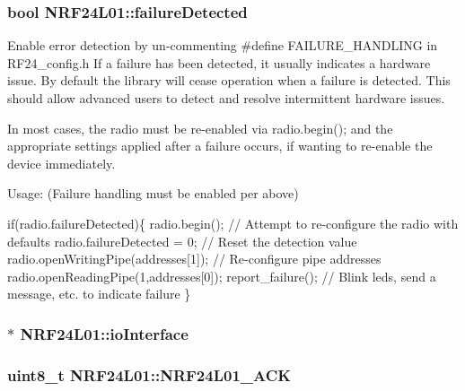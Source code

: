 \subsubsection[{\texorpdfstring{failure\+Detected}{failureDetected}}]{\setlength{\rightskip}{0pt plus 5cm}bool N\+R\+F24\+L01\+::failure\+Detected}\hypertarget{classNRF24L01_a749f38c45c00905b3d8e8c180626bff6}{}\label{classNRF24L01_a749f38c45c00905b3d8e8c180626bff6}
Enable error detection by un-\/commenting \#define F\+A\+I\+L\+U\+R\+E\+\_\+\+H\+A\+N\+D\+L\+I\+NG in R\+F24\+\_\+config.\+h If a failure has been detected, it usually indicates a hardware issue. By default the library will cease operation when a failure is detected. This should allow advanced users to detect and resolve intermittent hardware issues.

In most cases, the radio must be re-\/enabled via radio.\+begin(); and the appropriate settings applied after a failure occurs, if wanting to re-\/enable the device immediately.

Usage\+: (Failure handling must be enabled per above) 
\begin{DoxyCode}
\textcolor{keywordflow}{if}(radio.failureDetected)\{
  radio.begin();                       \textcolor{comment}{// Attempt to re-configure the radio with defaults}
  radio.failureDetected = 0;           \textcolor{comment}{// Reset the detection value}
 radio.openWritingPipe(addresses[1]); \textcolor{comment}{// Re-configure pipe addresses}
  radio.openReadingPipe(1,addresses[0]);
  report\_failure();                    \textcolor{comment}{// Blink leds, send a message, etc. to indicate failure}
\}
\end{DoxyCode}
\subsubsection[{\texorpdfstring{io\+Interface}{ioInterface}}]{$\ast$ N\+R\+F24\+L01\+::io\+Interface\hspace{0.3cm}{\ttfamily [private]}}\hypertarget{classNRF24L01_ae1eea9f32346ecf60ffbf5224d338359}{}\label{classNRF24L01_ae1eea9f32346ecf60ffbf5224d338359}
\subsubsection[{\texorpdfstring{N\+R\+F24\+L01\+\_\+\+A\+CK}{NRF24L01_ACK}}]{\setlength{\rightskip}{0pt plus 5cm}uint8\+\_\+t N\+R\+F24\+L01\+::\+N\+R\+F24\+L01\+\_\+\+A\+CK\hspace{0.3cm}{\ttfamily [private]}}\hypertarget{classNRF24L01_af2e0a88f330c86d0cc6c43180f70ecbd}{}\label{classNRF24L01_af2e0a88f330c86d0cc6c43180f70ecbd}
